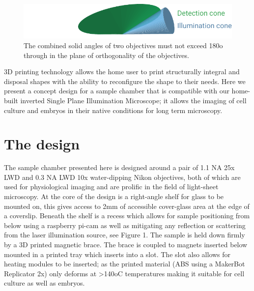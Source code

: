 \begin{figure}
    \centering
    \includegraphics{./solid_angles}
    \caption{The combined solid angles of two objectives must not exceed 180o through in the plane of orthogonality of the objectives.}
    \label{fig:solid_angles}
\end{figure}

3D printing technology allows the home user to print structurally integral and disposal shapes with the ability to reconfigure the shape to their needs.
Here we present a concept design for a sample chamber that is compatible with our home-built inverted Single Plane Illumination Microscope; it allows the imaging of cell culture and embryos in their native conditions for long term microscopy.


\section{The design}
The sample chamber presented here is designed around a pair of 1.1 NA 25x LWD and 0.3 NA LWD 10x water-dipping Nikon objectives, both of which are used for physiological imaging and are prolific in the field of light-sheet microscopy.
At the core of the design is a right-angle shelf for glass to be mounted on, this gives access to 2mm of accessible cover-glass area at the edge of a coverslip.
Beneath the shelf is a recess which allows for sample positioning from below using a raspberry pi-cam as well as mitigating any reflection or scattering from the laser illumination source, see Figure 1.
The sample is held down firmly by a 3D printed magnetic brace.
The brace is coupled to magnets inserted below mounted in a printed tray which inserts into a slot.
The slot also allows for heating modules to be inserted; as the printed material (ABS using a MakerBot Replicator 2x) only deforms at >140oC temperatures making it suitable for cell culture as well as embryos.

